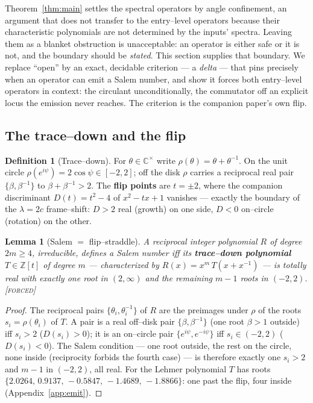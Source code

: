 \documentclass[11pt]{article}
\theoremstyle{plain}
\newtheorem{lemma}[theorem]{Lemma}
\theoremstyle{definition}
\newtheorem{definition}[theorem]{Definition}
\theoremstyle{remark}
\newcommand{\forced}{\textcolor{forcedc}{\textsc{[forced]}}}
\newcommand{\Z}{\mathbb{Z}}
\newcommand{\Cx}{\mathbb{C}}
\begin{document}
Theorem~\ref{thm:main} settles the spectral operators by angle confinement, an argument that does not transfer to the entry--level operators because their characteristic polynomials are not determined by the inputs' spectra. Leaving them as a blanket obstruction is unacceptable: an operator is either safe or it is not, and the boundary should be \emph{stated}. This section supplies that boundary. We replace ``open'' by an exact, decidable criterion --- a \emph{delta} --- that pins precisely when an operator can emit a Salem number, and show it forces both entry--level operators in context: the circulant unconditionally, the commutator off an explicit locus the emission never reaches. The criterion is the companion paper's own flip.

\subsection{The trace--down and the flip}\label{sec:tracedown}

\begin{definition}[Trace--down]\label{def:tracedown}
For $\theta\in\Cx^\times$ write $\rho(\theta)=\theta+\theta^{-1}$. On the unit circle $\rho(e^{i\psi})=2\cos\psi\in[-2,2]$; off the disk $\rho$ carries a reciprocal real pair $\{\beta,\beta^{-1}\}$ to $\beta+\beta^{-1}>2$. The \textbf{flip points} are $t=\pm2$, where the companion discriminant $D(t)=t^2-4$ of $x^2-tx+1$ vanishes --- exactly the boundary of the $\lambda=2c$ frame--shift: $D>2$ real (growth) on one side, $D<0$ on--circle (rotation) on the other.
\end{definition}

\begin{lemma}[Salem $=$ flip--straddle]\label{lem:salemflip}
A reciprocal integer polynomial $R$ of degree $2m\ge4$, irreducible, defines a Salem number iff its \textbf{trace--down polynomial} $T\in\Z[t]$ of degree $m$ --- characterized by $R(x)=x^m\,T(x+x^{-1})$ --- is totally real with \emph{exactly one} root in $(2,\infty)$ and the remaining $m-1$ roots in $(-2,2)$. \forced
\end{lemma}

\begin{proof}
The reciprocal pairs $\{\theta_i,\theta_i^{-1}\}$ of $R$ are the preimages under $\rho$ of the roots $s_i=\rho(\theta_i)$ of $T$. A pair is a real off--disk pair $\{\beta,\beta^{-1}\}$ (one root $\beta>1$ outside) iff $s_i>2$ ($D(s_i)>0$); it is an on--circle pair $\{e^{i\psi},e^{-i\psi}\}$ iff $s_i\in(-2,2)$ ($D(s_i)<0$). The Salem condition --- one root outside, the rest on the circle, none inside (reciprocity forbids the fourth case) --- is therefore exactly one $s_i>2$ and $m-1$ in $(-2,2)$, all real. For the Lehmer polynomial $T$ has roots $\{2.0264,\,0.9137,\,-0.5847,\,-1.4689,\,-1.8866\}$: one past the flip, four inside (Appendix~\ref{app:emit}). \end{proof}
\end{document}
